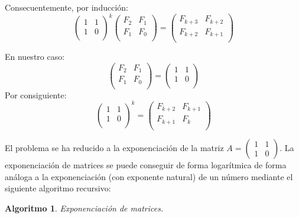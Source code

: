 \documentclass{article}
\theoremstyle{theorem-style}  %
\newtheorem{algorithm}{Algoritmo}
\theoremstyle{definition}
\theoremstyle{example-style}
\begin{document}
    Consecuentemente, por inducción:
    \begin{equation}
        \begin{pmatrix}
            1 & 1 \\
            1 & 0 \\
        \end{pmatrix}^k
        \begin{pmatrix}
            F_{2} & F_{1} \\
            F_{1} & F_{0} \\
        \end{pmatrix}
        =
        \begin{pmatrix}
            F_{k+3} & F_{k+2} \\
            F_{k+2} & F_{k+1} \\
        \end{pmatrix}        
    \end{equation}
    
    En nuestro caso:
    \begin{equation}
        \begin{pmatrix}
            F_{2} & F_{1} \\
            F_{1} & F_{0} \\
        \end{pmatrix}
        =
        \begin{pmatrix}
            1 & 1 \\
            1 & 0 \\
        \end{pmatrix}        
    \end{equation}
    Por consiguiente:
    \begin{equation}
        \begin{pmatrix}
            1 & 1 \\
            1 & 0 \\
        \end{pmatrix}^k
        =
        \begin{pmatrix}
            F_{k+2} & F_{k+1} \\
            F_{k+1} & F_{k} \\
        \end{pmatrix}        
    \end{equation}
    
    El problema se ha reducido a la exponenciación de la matriz $A =
    \begin{pmatrix} 
        1 & 1 \\ 
        1 & 0 
    \end{pmatrix}$. La exponenciación de matrices se puede conseguir de forma logarítmica de forma análoga a la exponenciación (con exponente natural) de un número mediante el siguiente algoritmo recursivo:
    
    \begin{algorithm} Exponenciación de matrices.
        
    \end{algorithm}
\end{document}
